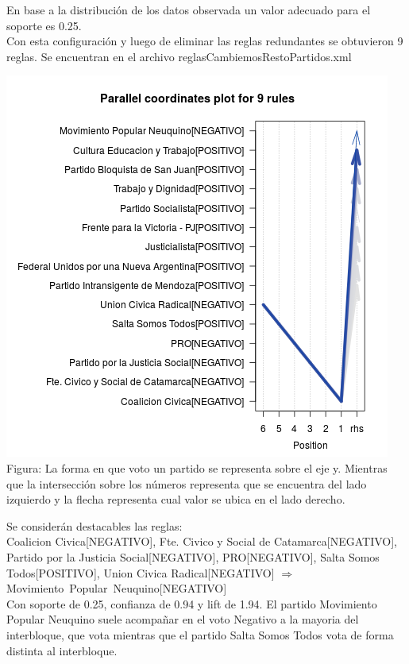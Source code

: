 \documentclass{endm}
\begin{document}
En base a la distribución de los datos observada un valor adecuado para el soporte es 0.25. \\

Con esta configuración y luego de eliminar las reglas redundantes se obtuvieron 9 reglas. Se encuentran en el archivo reglasCambiemosRestoPartidos.xml  \\

\begin{center}
\includegraphics[scale=0.4]{graficos/paracoordCambiemosRestoPartidos.png} \\
\scriptsize{Figura: La forma en que voto un partido se representa sobre el eje y. Mientras que la intersección sobre  los números representa que se encuentra del lado izquierdo y la flecha representa cual valor se ubica en el lado derecho.}
\end{center} 

Se considerán destacables las reglas: \\

{Coalicion Civica[NEGATIVO], Fte. Civico y Social de Catamarca[NEGATIVO], Partido por la Justicia Social[NEGATIVO], PRO[NEGATIVO], Salta Somos Todos[POSITIVO], Union Civica Radical[NEGATIVO]} $\Longrightarrow$ \\ {Movimiento\ Popular\ Neuquino[NEGATIVO]} \\

Con soporte de 0.25, confianza de 0.94 y lift de 1.94. El partido Movimiento Popular Neuquino suele acompañar en el voto Negativo a la mayoria del interbloque, que vota mientras que el partido Salta Somos Todos vota de forma distinta al interbloque. \\
\end{document}
